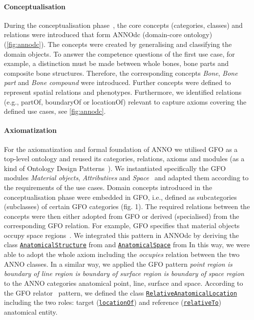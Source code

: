 \documentclass[sw]{iosart2x}
\newcommand{\anno}[1]{\href{https://annosaxfdm.de/ontology/#1}{\texttt{#1}}}
\begin{document}
\paragraph{Conceptualisation}
During the conceptualisation phase~\citep{herre2010}, the core concepts (categories, classes) and relations were introduced that form ANNOdc (domain-core ontology) (\cref{fig:annodc}).
The concepts were created by generalising and classifying the domain objects.
To answer the competence questions of the first use case, for example, a distinction must be made between whole bones, bone parts and composite bone structures.
Therefore, the corresponding concepts \emph{Bone}, \emph{Bone part} and \emph{Bone compound} were introduced.
Further concepts were defined to represent spatial relations and phenotypes.
Furthermore, we identified relations (e.g., partOf, boundaryOf or locationOf) relevant to capture axioms covering the defined use cases, see \cref{fig:annodc}.

\paragraph{Axiomatization}
For the axiomatization and formal foundation of ANNO we utilised GFO as a top-level ontology and reused its categories, relations, axioms and modules (as a kind of Ontology Design Patterns~\citep{ODP2005, XD2016, MOMo2023}).
We instantiated specifically the GFO modules \emph{Material objects}, \emph{Attributives} and \emph{Space}~\citep{Burek2020, Loebe2021, Loebe2018} and adapted them according to the requirements of the use cases.
Domain concepts introduced in the conceptualisation phase were embedded in GFO, i.e., defined as subcategories (subclasses) of certain GFO categories (fig. 1).
The required relations between the concepts were then either adopted from GFO or derived (specialised) from the corresponding GFO relation.
For example, GFO specifies that material objects occupy space regions~\citep{Loebe2021}.
We integrated this pattern in ANNOdc by deriving the class \anno{AnatomicalStructure} from  and \anno{AnatomicalSpace} from 
In this way, we were able to adopt the whole axiom including the \emph{occupies} relation between the two ANNO classes.
In a similar way, we applied the GFO pattern \emph{point region is boundary of line region is boundary of surface region is boundary of space region}~\citep{baumann2016} to the ANNO categories anatomical point, line, surface and space.
According to the GFO relator~\citep{Loebe2018} pattern, we defined the class \anno{RelativeAnatomicalLocation} including the two roles: target (\anno{locationOf}) and reference (\anno{relativeTo}) anatomical entity. %
\end{document}
